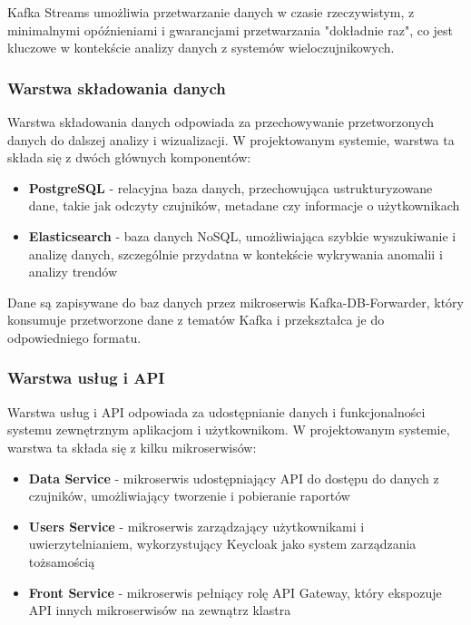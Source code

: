 Kafka Streams umożliwia przetwarzanie danych w czasie rzeczywistym, z minimalnymi opóźnieniami i gwarancjami przetwarzania "dokładnie raz", co jest kluczowe w kontekście analizy danych z systemów wieloczujnikowych.

\subsubsection{Warstwa składowania danych}
\label{subsubsec:warstwa_skladowania}

Warstwa składowania danych odpowiada za przechowywanie przetworzonych danych do dalszej analizy i wizualizacji. W projektowanym systemie, warstwa ta składa się z dwóch głównych komponentów:

\begin{itemize}
    \item \textbf{PostgreSQL} - relacyjna baza danych, przechowująca ustrukturyzowane dane, takie jak odczyty czujników, metadane czy informacje o użytkownikach
    \item \textbf{Elasticsearch} - baza danych NoSQL, umożliwiająca szybkie wyszukiwanie i analizę danych, szczególnie przydatna w kontekście wykrywania anomalii i analizy trendów
\end{itemize}

Dane są zapisywane do baz danych przez mikroserwis Kafka-DB-Forwarder, który konsumuje przetworzone dane z tematów Kafka i przekształca je do odpowiedniego formatu.

\subsubsection{Warstwa usług i API}
\label{subsubsec:warstwa_uslug}

Warstwa usług i API odpowiada za udostępnianie danych i funkcjonalności systemu zewnętrznym aplikacjom i użytkownikom. W projektowanym systemie, warstwa ta składa się z kilku mikroserwisów:

\begin{itemize}
    \item \textbf{Data Service} - mikroserwis udostępniający API do dostępu do danych z czujników, umożliwiający tworzenie i pobieranie raportów
    \item \textbf{Users Service} - mikroserwis zarządzający użytkownikami i uwierzytelnianiem, wykorzystujący Keycloak jako system zarządzania tożsamością
    \item \textbf{Front Service} - mikroserwis pełniący rolę API Gateway, który ekspozuje API innych mikroserwisów na zewnątrz klastra
\end{itemize}

